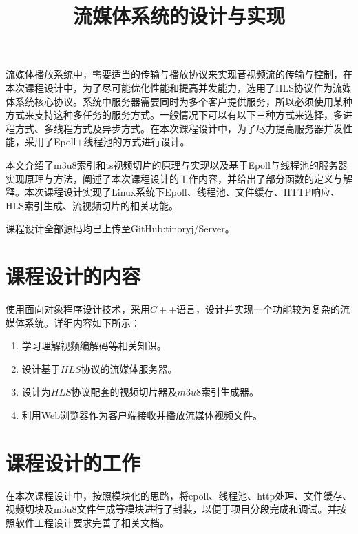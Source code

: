 \documentclass[bachelor]{thesis-uestc}
\title{流媒体系统的设计与实现}
\author{}
\begin{document}
\begin{chineseabstract}

流媒体播放系统中，需要适当的传输与播放协议来实现音视频流的传输与控制，在本次课程设计中，为了尽可能优化性能和提高并发能力，选用了HLS协议作为流媒体系统核心协议。系统中服务器需要同时为多个客户提供服务，所以必须使用某种方式来支持这种多任务的服务方式。一般情况下可以有以下三种方式来选择，多进程方式、多线程方式及异步方式。在本次课程设计中，为了尽力提高服务器并发性能，采用了Epoll$+$线程池的方式进行设计。

本文介绍了m3u8索引和ts视频切片的原理与实现以及基于Epoll与线程池的服务器实现原理与方法，阐述了本次课程设计的工作内容，并给出了部分函数的定义与解释。本次课程设计实现了Linux系统下Epoll、线程池、文件缓存、HTTP响应、HLS索引生成、流视频切片的相关功能。

课程设计全部源码均已上传至GitHub:tinoryj/Server。



\end{chineseabstract}

\thesistableofcontents

\thesischapterexordium

\section{课程设计的内容}

使用面向对象程序设计技术，采用$C++$语言，设计并实现一个功能较为复杂的流媒体系统。详细内容如下所示：

\begin{enumerate}
	\item 学习理解视频编解码等相关知识。
	\item 设计基于$HLS$协议的流媒体服务器。
	\item 设计为$HLS$协议配套的视频切片器及$m3u8$索引生成器。
	\item 利用Web浏览器作为客户端接收并播放流媒体视频文件。

\end{enumerate}


\section{课程设计的工作}

在本次课程设计中，按照模块化的思路，将epoll、线程池、http处理、文件缓存、视频切块及m3u8文件生成等模块进行了封装，以便于项目分段完成和调试。并按照软件工程设计要求完善了相关文档。
\end{document}
